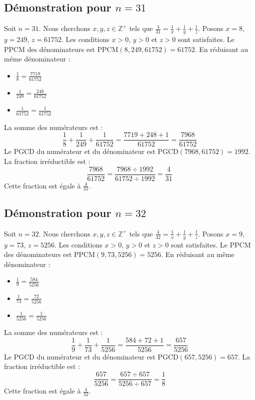 \documentclass[11pt,a4paper]{article}
\begin{document}
\subsection{Démonstration pour $n = 31$}
Soit $n = 31$. Nous cherchons $x, y, z \in \mathbb{Z}^{+}$ tels que $\frac{4}{31} = \frac{1}{x} + \frac{1}{y} + \frac{1}{z}$.
Posons $x = 8$, $y = 249$, $z = 61752$.
Les conditions $x > 0$, $y > 0$ et $z > 0$ sont satisfaites.
Le PPCM des dénominateurs est $\text{PPCM}(8, 249, 61752) = 61752$.
En réduisant au même dénominateur :
\begin{itemize}
    \item $\frac{1}{8} = \frac{7719}{61752}$
    \item $\frac{1}{249} = \frac{248}{61752}$
    \item $\frac{1}{61752} = \frac{1}{61752}$
\end{itemize}
La somme des numérateurs est :
$$ \frac{1}{8} + \frac{1}{249} + \frac{1}{61752} = \frac{7719 + 248 + 1}{61752} = \frac{7968}{61752} $$
Le PGCD du numérateur et du dénominateur est $\text{PGCD}(7968, 61752) = 1992$.
La fraction irréductible est :
$$ \frac{7968}{61752} = \frac{7968 \div 1992}{61752 \div 1992} = \frac{4}{31} $$
Cette fraction est égale à $\frac{4}{31}$.

\subsection{Démonstration pour $n = 32$}
Soit $n = 32$. Nous cherchons $x, y, z \in \mathbb{Z}^{+}$ tels que $\frac{4}{32} = \frac{1}{x} + \frac{1}{y} + \frac{1}{z}$.
Posons $x = 9$, $y = 73$, $z = 5256$.
Les conditions $x > 0$, $y > 0$ et $z > 0$ sont satisfaites.
Le PPCM des dénominateurs est $\text{PPCM}(9, 73, 5256) = 5256$.
En réduisant au même dénominateur :
\begin{itemize}
    \item $\frac{1}{9} = \frac{584}{5256}$
    \item $\frac{1}{73} = \frac{72}{5256}$
    \item $\frac{1}{5256} = \frac{1}{5256}$
\end{itemize}
La somme des numérateurs est :
$$ \frac{1}{9} + \frac{1}{73} + \frac{1}{5256} = \frac{584 + 72 + 1}{5256} = \frac{657}{5256} $$
Le PGCD du numérateur et du dénominateur est $\text{PGCD}(657, 5256) = 657$.
La fraction irréductible est :
$$ \frac{657}{5256} = \frac{657 \div 657}{5256 \div 657} = \frac{1}{8} $$
Cette fraction est égale à $\frac{4}{32}$.
\end{document}
